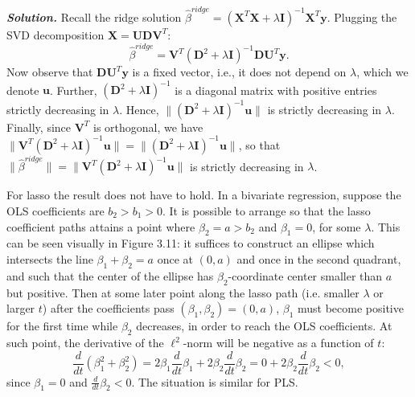 \documentclass[12pt]{article}
\def\bX{\textbf{X}}
\def\bu{\textbf{u}}
\def\by{\textbf{y}}
\def\bV{\textbf{V}}
\def\bI{\textbf{I}}
\def\bU{\textbf{U}}
\def\bD{\textbf{D}}
\def\bV{\textbf{V}}
\newenvironment{solution}[1][\it{Solution}]{\textbf{#1. } }{\vspace{.5cm}}
\begin{document}
\begin{solution}
	Recall the ridge solution $\hat{\beta}^{ridge} = (\bX^T \bX + \lambda \bI)^{-1}\bX^T \by$. Plugging the SVD decomposition $\bX = \bU \bD \bV^T$: 
	$$\hat{\beta}^{ridge} =\bV^T(\bD^2 + \lambda \bI )^{-1}\bD \bU^T \by.$$
	Now observe that $\bD \bU^T \by$ is a fixed vector, i.e., it does not depend on $\lambda$, which we denote $\bu$. Further, $(\bD^2 + \lambda \bI )^{-1}$ is a diagonal matrix with positive entries strictly decreasing in $\lambda$. Hence, $\|(\bD^2 + \lambda \bI )^{-1} \bu\|$ is strictly decreasing in $\lambda$. Finally, since $\bV^T$ is orthogonal, we have $\|\bV^T(\bD^2 + \lambda \bI )^{-1} \bu\|= \|(\bD^2 + \lambda \bI )^{-1} \bu\|$, so that $\|\hat{\beta}^{ridge}\| = \|\bV^T(\bD^2 + \lambda \bI )^{-1} \bu\|$ is strictly decreasing in $\lambda$.
	
	For lasso the result does not have to hold. In a bivariate regression, suppose the OLS coefficients are $b_2 > b_1 > 0$. It is possible to arrange so that the lasso coefficient paths attains a point where $\beta_2 = a > b_2$ and $\beta_1 = 0$, for some $\lambda$. This can be seen visually in Figure 3.11: it suffices to construct an ellipse which intersects the line $\beta_1 + \beta_2 = a$ once at $(0,a)$ and once in the second quadrant, and such that the center of the ellipse has $\beta_2$-coordinate center smaller than $a$ but positive. Then at some later point along the lasso path (i.e. smaller $\lambda$ or larger $t$) after the coefficients pass $(\beta_1, \beta_2) = (0,a)$, $\beta_1$ must become positive for the first time while $\beta_2$ decreases, in order to reach the OLS coefficients. At such point, the derivative of the $\ell^2$-norm will be negative as a function of $t$:
	$$\frac{d}{dt} (\beta_1^2 + \beta_2^2) = 2 \beta_1 \frac{d}{dt} \beta_1 + 2 \beta_2 \frac{d}{dt} \beta_2 = 0 + 2 \beta_2 \frac{d}{dt} \beta_2 < 0,$$
since $\beta_1 = 0$ and $\frac{d}{dt} \beta_2 < 0$. The situation is similar for PLS.	
\end{solution}
\end{document}
